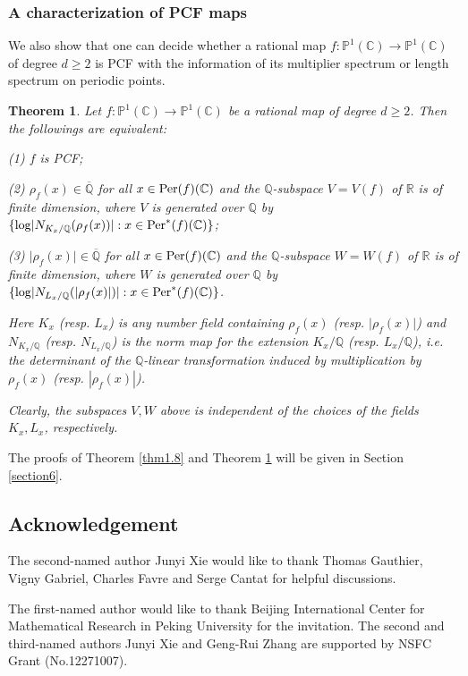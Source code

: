 \documentclass[12pt]{amsart}
\theoremstyle{plain}
\newtheorem{Thm}{Theorem}[section]
\theoremstyle{remark}
\theoremstyle{definition}
\def\Q{\mathbb Q}
\def\R{\mathbb R}
\def\C{\mathbb C}
\def\P{\mathbb P}
\begin{document}
\subsubsection{A characterization of PCF maps}
We also show that one can decide whether a rational map $f:\P^1(\C)\to\P^1(\C)$ of degree $d\geq2$ is PCF with the information of its multiplier spectrum or length spectrum on periodic points. 
\begin{Thm}\label{pcfdec}Let $f:\P^1(\C)\to\P^1(\C)$ be a rational map of degree $d\geq2$. Then the followings are equivalent:\par
(1) $f$ is PCF;\par
(2) $\rho_f(x)\in\overline{\Q}$ for all $x\in{\rm Per}(f)(\C)$ and the $\Q$-subspace $V=V(f)$ of $\R$ is of finite dimension, where $V$ is generated over $\Q$ by $\{\log\lvert N_{K_x/\Q}(\rho_f(x))\rvert:x\in{\rm Per}^*(f)(\C)\}$;\par
(3) $\lvert\rho_f(x)\rvert\in\overline{\Q}$ for all $x\in{\rm Per}(f)(\C)$ and the $\Q$-subspace $W=W(f)$ of $\R$ is of finite dimension, where $W$ is generated over $\Q$ by $\{\log\lvert N_{L_x/\Q}(\lvert\rho_f(x)\rvert)\rvert:x\in{\rm Per}^*(f)(\C)\}$.
\medskip
\par Here $K_x$ (resp. $L_x$) is any number field containing $\rho_f(x)$ (resp. $\lvert\rho_f(x)\rvert$) and $N_{K_x/\Q}$ (resp. $N_{L_x/\Q}$) is the norm map for the extension $K_x/\Q$ (resp. $L_x/\Q$), i.e. the determinant of the $\Q$-linear transformation induced by multiplication by $\rho_f(x)$ (resp. $|\rho_f(x)|$).
\par
\medskip
Clearly, the subspaces $V,W$ above is independent of the choices of the fields $K_x,L_x$, respectively.
\end{Thm}
The proofs of Theorem \ref{thm1.8} and Theorem \ref{pcfdec} will be given in Section \ref{section6}.
\subsection*{Acknowledgement}
The second-named author Junyi Xie would like to thank Thomas Gauthier, Vigny Gabriel, Charles Favre and Serge Cantat for helpful discussions.
\par The first-named author would like to thank Beijing International Center for Mathematical Research in Peking University for the invitation. The second and third-named authors Junyi Xie and Geng-Rui Zhang are supported by NSFC Grant (No.12271007).
\end{document}
